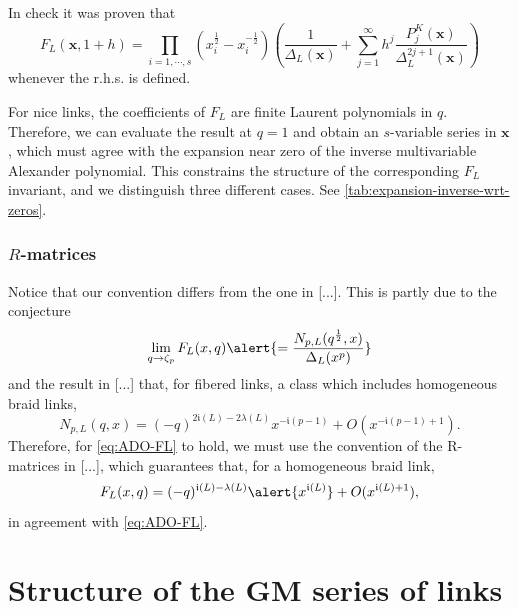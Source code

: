 \documentclass[11pt,e-only]{amsart}
\begin{document}
In \cite{Park21} \alert{check} it was proven that
\begin{equation}
    F_L(\mathbf{x},1+h)=\prod_{i=1,\cdots,s} \left(x_i^{\frac12}-x_i^{-\frac12}\right) \left(\frac{1}{\Delta_L(\mathbf{x})}+\sum_{j=1}^\infty h^j \frac{P_j^K(\mathbf{x})}{\Delta^{2j+1}_L(\mathbf{x})}\right)
\end{equation}
whenever the r.h.s. is defined.

For nice links, the coefficients of $F_L$ are finite Laurent polynomials in $q$. Therefore, we can evaluate the result at $q=1$ and obtain an $s$-variable series in $\mathbf{x}$, which must agree with the expansion near zero of the inverse multivariable Alexander polynomial. This constrains the structure of the corresponding $F_L$ invariant, and we distinguish three different cases. See \cref{tab:expansion-inverse-wrt-zeros}.

\subsubsection{$R$-matrices}

\begin{remark}
Notice that our convention differs from the one in [...]. This is partly due to the conjecture 
\begin{equation}\label{eq:ADO-FL} %
    \lim_{q\rightarrow \zeta_p} F_L(x,q) \alert{= \frac{N_{p,L}(q^\frac12,x)}{\Delta_L(x^p)}}
\end{equation} 
and the result in [...] that, for fibered links, a class which includes homogeneous braid links,
\begin{equation}
    N_{p,L}(q,x)=(-q)^{2\mathfrak{i}(L)-2\lambda(L)}x^{-\mathfrak{i}(p-1)} + O(x^{-\mathfrak{i}(p-1)+1}).
\end{equation}
Therefore, for \cref{eq:ADO-FL} to hold, we must use the convention of the R-matrices in [...], which guarantees that, for a homogeneous braid link,
\begin{equation} %
    F_L(x,q)= (-q)^{\mathfrak{i}(L)-\lambda(L)} \alert{x^{\mathfrak{i}(L)}}+O(x^{\mathfrak{i}(L)+1}),
\end{equation}
in agreement with \cref{eq:ADO-FL}.
\end{remark}

\section{Structure of the GM series of links}
\end{document}
